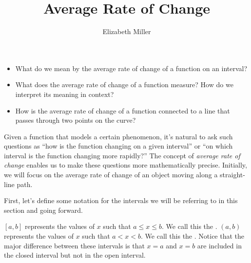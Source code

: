 \documentclass[nooutcomes]{ximera}
\author{Elizabeth Miller}
\title{Average Rate of Change}
\begin{document}
\begin{abstract}
  
\end{abstract}
\maketitle



\begin{motivatingQuestions}\begin{itemize}
\item What do we mean by the average rate of change of a function on an interval?
\item What does the average rate of change of a function measure?  How do we interpret its meaning in context?
\item How is the average rate of change of a function connected to a line that passes through two points on the curve?
\end{itemize}\end{motivatingQuestions}



Given a function that models a certain phenomenon, it's natural to ask such questions as ``how is the function changing on a given interval'' or ``on which interval is the function changing more rapidly?'' The concept of \emph{average rate of change} enables us to make these questions more mathematically precise. Initially, we will focus on the average rate of change of an object moving along a straight-line path.

First, let's define some notation for the intervals we will be referring to in this section and going forward.

\begin{definition}
$[a, b]$ represents the values of $x$ such that $a \leq x \leq b$.  We call this the .
$(a, b)$ represents the values of $x$ such that $a < x < b$.  We call this the .
Notice that the major difference between these intervals is that $x=a$ and $x=b$ are included in the closed interval but not in the open interval.
\end{definition}
\end{document}
